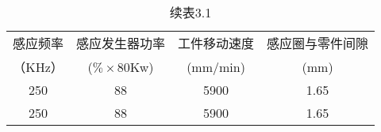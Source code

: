 \begin{table}[htbp]
    \centering
    \captionsetup{singlelinecheck=off}
    \caption*{续表3.1}
    \small
    \begin{tabular}{c c c c}
    \toprule
    感应频率 &感应发生器功率 & 工件移动速度  &感应圈与零件间隙\\
    （KHz）&($\% \times$80Kw) &(mm/min)  &(mm)\\
    \midrule
    250 &88 &5900 &1.65\\
    
    250 &88 &5900 &1.65\\
    \bottomrule
    \end{tabular}
    \end{table}
    \vspace{\baselineskip}
    
